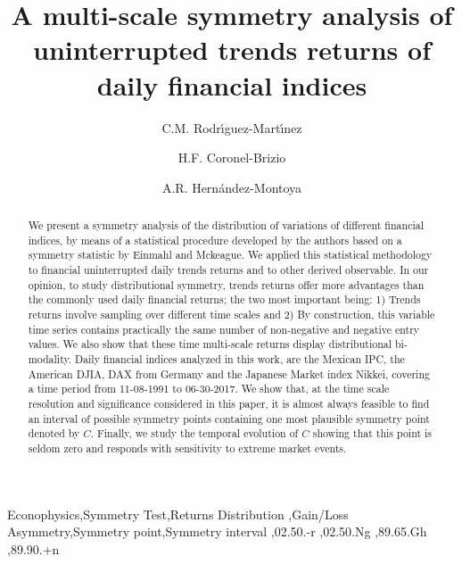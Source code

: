 \documentclass{elsarticle}
\begin{document}
\begin{frontmatter}


\title{A multi-scale symmetry analysis of uninterrupted trends returns of daily financial indices}

\author[mymainaddress]{C.M. Rodr\'{\i}guez-Mart\'{\i}nez}
\author[mymainaddress,mysecondaryaddress]{H.F. Coronel-Brizio} 
\author[mymainaddress,mysecondaryaddress]{A.R. Hern\'andez-Montoya}


\address[mymainaddress]{Centro de Investigaci\'on en Inteligencia Artificial. Universidad Veracruzana. Sebasti\'an Camacho 5, Xalapa Veracruz 91000, M\'exico. Tel/Fax: 52-228-8172957/8172855.}

\address[mysecondaryaddress]{Facultad de F\'{\i}sica. Universidad Veracruzana, Apdo. Postal 475. Xalapa, Veracruz. M\'{e}xico.}

\begin{abstract}

  We present a symmetry analysis of the distribution of variations of different financial indices, by means of a statistical procedure developed by the authors  based on a symmetry statistic by Einmahl and Mckeague. We applied this statistical methodology to financial  uninterrupted daily trends returns and to other derived observable. In our opinion, to study distributional symmetry, trends returns offer more advantages than the commonly used daily financial returns; the two most important being: 1) Trends returns involve sampling over different time scales and 2) By  construction, this variable time series contains practically the same number of non-negative  and negative entry values. We  also show that these time multi-scale returns display distributional bi-modality. 
Daily financial indices analyzed in this work, are the Mexican IPC, the American DJIA, DAX from Germany and the Japanese Market index Nikkei, covering a time period from 11-08-1991 to 06-30-2017. We show that, at the time scale resolution and significance considered in this paper, it is almost always feasible to find an interval of possible symmetry points containing one most plausible symmetry point denoted by $C$. Finally, we study the temporal evolution of $C$ showing that this point is seldom zero and responds with sensitivity to extreme market events.
\end{abstract}
\begin{keyword}
Econophysics\sep Symmetry Test\sep Returns Distribution \sep Gain/Loss Asymmetry\sep Symmetry point\sep Symmetry interval
\sep 02.50.-r \sep 02.50.Ng \sep 89.65.Gh \sep 89.90.+n 
\end{keyword}

\end{frontmatter}
\end{document}
